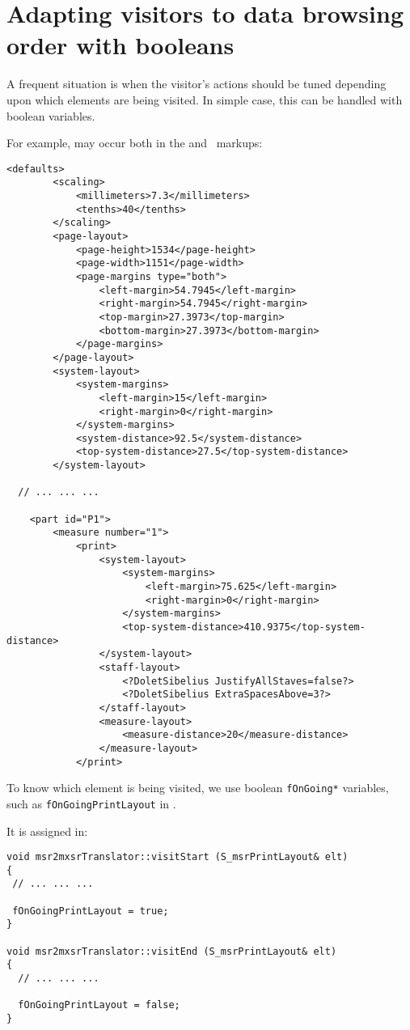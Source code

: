 \section{Adapting visitors to data browsing order with booleans}

A frequent situation is when the visitor's actions should be tuned depending upon which elements are being visited. In simple case, this can be handled with boolean variables.

For example,  may occur both in the  and  \mxml\ markups:
\begin{lstlisting}[language=MusicXML]
	<defaults>
		<scaling>
			<millimeters>7.3</millimeters>
			<tenths>40</tenths>
		</scaling>
		<page-layout>
			<page-height>1534</page-height>
			<page-width>1151</page-width>
			<page-margins type="both">
				<left-margin>54.7945</left-margin>
				<right-margin>54.7945</right-margin>
				<top-margin>27.3973</top-margin>
				<bottom-margin>27.3973</bottom-margin>
			</page-margins>
		</page-layout>
		<system-layout>
			<system-margins>
				<left-margin>15</left-margin>
				<right-margin>0</right-margin>
			</system-margins>
			<system-distance>92.5</system-distance>
			<top-system-distance>27.5</top-system-distance>
		</system-layout>

  // ... ... ...

	<part id="P1">
		<measure number="1">
			<print>
				<system-layout>
					<system-margins>
						<left-margin>75.625</left-margin>
						<right-margin>0</right-margin>
					</system-margins>
					<top-system-distance>410.9375</top-system-distance>
				</system-layout>
				<staff-layout>
					<?DoletSibelius JustifyAllStaves=false?>
					<?DoletSibelius ExtraSpacesAbove=3?>
				</staff-layout>
				<measure-layout>
					<measure-distance>20</measure-distance>
				</measure-layout>
			</print>
\end{lstlisting}

To know which element is being visited, we use boolean {\tt fOnGoing*} variables, such as {\tt fOnGoingPrintLayout} in .

It is assigned in:
\begin{lstlisting}[language=CPlusPlus]
void msr2mxsrTranslator::visitStart (S_msrPrintLayout& elt)
{
 // ... ... ...

 fOnGoingPrintLayout = true;
}

void msr2mxsrTranslator::visitEnd (S_msrPrintLayout& elt)
{
  // ... ... ...

  fOnGoingPrintLayout = false;
}
\end{lstlisting}

